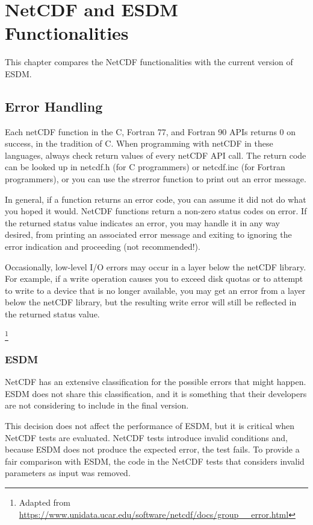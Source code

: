 \chapter{NetCDF and ESDM Functionalities}
\label{ch:func}

This chapter compares the NetCDF functionalities with the current version of ESDM.

\section{Error Handling}

{\itshape

Each netCDF function in the C, Fortran 77, and Fortran 90 APIs returns 0 on success, in the tradition of C.
When programming with netCDF in these languages, always check return values of every netCDF API call. The return code can be looked up in netcdf.h (for C programmers) or netcdf.inc (for Fortran programmers), or you can use the strerror function to print out an error message.

In general, if a function returns an error code, you can assume it did not do what you hoped it would.
NetCDF functions return a non-zero status codes on error. If the returned status value indicates an error, you may handle it in any way desired, from printing an associated error message and exiting to ignoring the error indication and proceeding (not recommended!).

Occasionally, low-level I/O errors may occur in a layer below the netCDF library. For example, if a write operation causes you to exceed disk quotas or to attempt to write to a device that is no longer available, you may get an error from a layer below the netCDF library, but the resulting write error will still be reflected in the returned status value.
}\footnote{Adapted from \url{https://www.unidata.ucar.edu/software/netcdf/docs/group__error.html}}

\subsection{ESDM}

NetCDF has an extensive classification for the possible errors that might happen. ESDM does not share this classification, and it is something that their developers are not considering to include in the final version.

This decision does not affect the performance of ESDM, but it is critical when NetCDF tests are evaluated. NetCDF tests introduce invalid conditions and, because ESDM does not produce the expected error, the test fails. To provide a fair comparison with ESDM, the code in the NetCDF tests that considers invalid parameters as input was removed.

